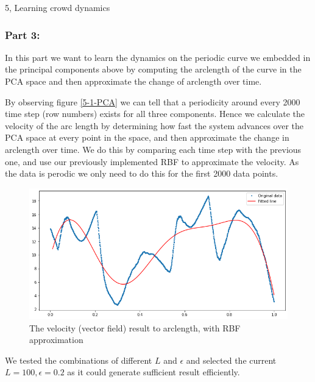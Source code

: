 \documentclass[10pt,a4paper]{article}
\begin{document}
\begin{task}{5, Learning crowd dynamics}
\subsubsection*{Part 3:}

In this part we want to learn the dynamics on the periodic curve we embedded in the principal components above by computing the arclength of the curve in the PCA space and then approximate the change of arclength over time. 

By observing figure \ref{5-1-PCA} we can tell that a periodicity around every 2000 time step (row numbers) exists for all three components. Hence we calculate the velocity of the arc length by determining how fast the system advances over the PCA space at every point in the space, and then approximate the change in arclength over time. We do this by comparing each time step with the previous one, and use our previously implemented RBF to approximate the velocity. As the data is perodic we only need to do this for the first 2000 data points.


\begin{figure}[H]
    \centering
    \includegraphics[width=15cm]{images/task5-3-RBF.png}
    \caption{The velocity (vector field) result to arclength, with RBF approximation}
    \label{5-3}
\end{figure}

We tested the combinations of different $L$ and $\epsilon$ and selected the current $L=100, \epsilon=0.2$ as it could generate sufficient result efficiently.

\bigskip







\end{task}




\end{document}
